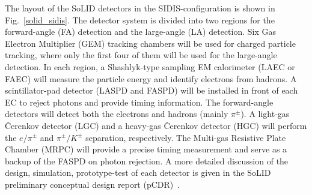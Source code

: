 The layout of the SoLID detectors in the SIDIS-configuration is shown in
Fig.~\ref{solid_sidis}. The detector system is divided into two regions for the
forward-angle (FA) detection and the large-angle (LA) detection. Six Gas
Electron Multiplier (GEM) tracking chambers will be used for charged particle
tracking, where only the first four of them will be used for the large-angle
detection. In each region, a Shashlyk-type sampling EM calorimeter (LAEC or
FAEC) will measure the particle energy and identify electrons from hadrons. A
scintillator-pad detector (LASPD and FASPD) will be installed in front of each
EC to reject photons and provide timing information. The forward-angle
detectors will detect both the electrons and hadrons (mainly $\pi^{\pm}$). A
light-gas \v{C}erenkov detector (LGC) and a heavy-gas \v{C}erenkov detector
(HGC) will perform the $e/\pi^{\pm}$ and $\pi^{\pm}/K^{\pm}$ separation,
respectively. The Multi-gas Resistive Plate Chamber (MRPC) will provide a
precise timing measurement and serve as a backup of the FASPD on photon
rejection. A more detailed discussion of the design, simulation, prototype-test
of each detector is given in the SoLID preliminary conceptual design report
(pCDR)~\cite{solid_pcdr}.

